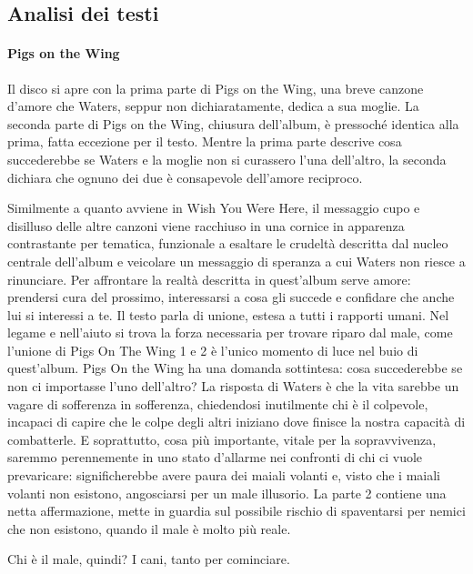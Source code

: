 \documentclass[class=book, crop=false, oneside, 12pt]{standalone}
\begin{document}
    \subsection{Analisi dei testi}
    \label{subsec:animals-lyrics}

    \paragraph{Pigs on the Wing}
    Il disco si apre con la prima parte di Pigs on the Wing, una breve canzone d'amore che Waters, seppur non dichiaratamente, dedica a sua moglie. La seconda parte di Pigs on the Wing, chiusura dell'album, è pressoché  identica alla prima, fatta eccezione per il testo. Mentre la prima parte descrive cosa succederebbe se Waters e la moglie non si curassero l'una dell'altro, la seconda dichiara che ognuno dei due è consapevole dell'amore reciproco. 

    Similmente a quanto avviene in Wish You Were Here, il messaggio cupo e disilluso delle altre canzoni viene racchiuso in una cornice in apparenza contrastante per tematica, funzionale a esaltare le crudeltà descritta dal nucleo centrale dell'album e veicolare un messaggio di speranza a cui Waters non riesce a rinunciare. Per affrontare la realtà descritta in quest'album serve amore: prendersi cura del prossimo, interessarsi a cosa gli succede e confidare che anche lui si interessi a te. Il testo parla di unione, estesa a tutti i rapporti umani. Nel legame e nell'aiuto si trova la forza necessaria per trovare riparo dal male, come l'unione di Pigs On The Wing 1 e 2 è l'unico momento di luce nel buio di quest'album. Pigs On the Wing ha una domanda sottintesa: cosa succederebbe se non ci importasse l'uno dell'altro? La risposta di Waters è che la vita sarebbe un vagare di sofferenza in sofferenza, chiedendosi inutilmente chi è il colpevole, incapaci di capire che le colpe degli altri iniziano dove finisce la nostra capacità di combatterle. E soprattutto, cosa più importante, vitale per la sopravvivenza, saremmo perennemente in uno stato d'allarme nei confronti di chi ci vuole prevaricare: significherebbe avere paura dei maiali volanti e, visto che i maiali volanti non esistono, angosciarsi per un male illusorio. La parte 2 contiene una netta affermazione, mette in guardia sul possibile rischio di spaventarsi per nemici che non esistono, quando il male è molto più reale.

    Chi è il male, quindi? I cani, tanto per cominciare.
\end{document}
